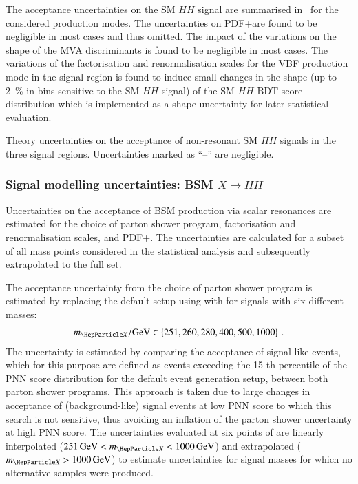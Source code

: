 The acceptance uncertainties on the SM $HH$ signal are summarised
in~ for the considered production
modes. The uncertainties on PDF+\alphas are found to be negligible in
most cases and thus omitted. The impact of the variations on the shape
of the MVA discriminants is found to be negligible in most cases. The
variations of the factorisation and renormalisation scales for the VBF
production mode in the \hadhad signal region is found to induce small
changes in the shape (up to \SI{2}{\percent} in bins sensitive to the
SM $HH$ signal) of the SM $HH$ BDT score distribution which is
implemented as a shape uncertainty for later statistical evaluation.

\begin{table}[htbp]
  \centering

  

  \caption{Theory uncertainties on the acceptance of non-resonant SM
    $HH$ signals in the three signal regions. Uncertainties marked as
    ``--'' are negligible.}
  \label{tab:theory_uncertainty_signal}
\end{table}


\subsubsection{Signal modelling uncertainties: BSM $X \to HH$}

Uncertainties on the acceptance of BSM \HH production via scalar
resonances are estimated for the choice of parton shower program,
factorisation and renormalisation scales, and PDF+\alphas. The
uncertainties are calculated for a subset of all mass points
considered in the statistical analysis and subsequently extrapolated
to the full set.

The acceptance uncertainty from the choice of parton shower program is
estimated by replacing the default setup using \HERWIG[7.1.3] with
\PYTHIA[8.235] for signals with six different masses:
\begin{align*}
  \mX / \si{\GeV} \in \left\{ 251, 260, 280, 400, 500, 1000
\right\} \,\text{.}
\end{align*}
The uncertainty is estimated by comparing the acceptance of
signal-like events, which for this purpose are defined as events
exceeding the 15-th percentile of the PNN score distribution for the
default event generation setup, between both parton shower
programs. This approach is taken due to large changes in acceptance of
(background-like) signal events at low PNN score to which this search
is not sensitive, thus avoiding an inflation of the parton shower
uncertainty at high PNN score. The uncertainties evaluated at six
points of \mX are linearly interpolated
($\SI{251}{\GeV} < \mX < \SI{1000}{\GeV}$) and extrapolated
($\mX > \SI{1000}{\GeV}$) to estimate uncertainties for signal masses
for which no alternative samples were produced.

